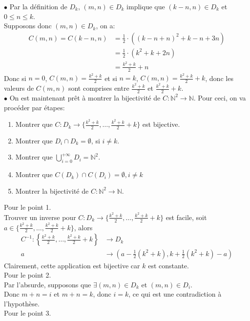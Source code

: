 \documentclass[11pt, a4paper]{article}
\begin{document}
		$\bullet$ Par la définition de $D_k$, $(m,n) \in D_k$ implique que $(k-n,n)\in D_k$ et $0\leq n\leq k$.\\
		Supposons donc $(m,n) \in D_k$, on a:
		\begin{align*}
			C(m,n)=C(k-n,n)&= \frac{1}{2} \cdot \left( (k-n+n)^{2} + k-n + 3n\right)\\
				       &= \frac{1}{2} \cdot \left( k^{2} + k + 2n\right)\\
				       &= \frac{k^{2}+k}{2} + n
		\end{align*}
		Donc si $n=0$, $C(m,n)= \frac{k^{2}+k}{2}$ et si $n=k$, $C(m,n)= \frac{k^{2}+k}{2}+k$, donc les valeurs de $C(m,n)$ sont comprises entre $\frac{k^{2}+k}{2}$ et  $\frac{k^{2}+k}{2}+k$.\\
		$\bullet$ On est maintenant prêt à montrer la bijectivité de $C: \mathbb{N}^{2} \to \mathbb{N}$.
		Pour ceci, on va procéder par étapes:
		\begin{enumerate}
			\item Montrer que $C:D_k \to \{\frac{k^{2}+k}{2},\ldots,\frac{k^{2}+k}{2}+k\}$ est bijective.
			\item Montrer que $ D_i \cap D_k= \emptyset$, si $i\neq k$.
			\item Montrer que $\bigcup_{i=0}^{+\infty} D_i = \mathbb{N}^{2}$.
			\item Montrer que $C(D_k)\cap C(D_i) = \emptyset, i \neq k$
			\item Montrer la bijectivité de $C: \mathbb{N}^{2} \to \mathbb{N}$.
		\end{enumerate}
		Pour le point 1.\\
		Trouver un inverse pour $C:D_k \to \{\frac{k^{2}+k}{2},\ldots,\frac{k^{2}+k}{2}+k\}$ est facile, soit $a \in \{\frac{k^{2}+k}{2},\ldots,\frac{k^{2}+k}{2}+k\}$, alors
		\begin{align*}
			C^{-1}: \left\{\frac{k^{2}+k}{2},\ldots,\frac{k^{2}+k}{2}+k\right\} &\to D_k\\
			a &\to \left(a-\frac{1}{2}(k^{2}+k),k+\frac{1}{2}(k^{2}+k)-a\right)
		\end{align*}
		Clairement, cette application est bijective car $k$ est constante.\\
		Pour le point 2.\\
		Par l'absurde, supposons que $\exists (m,n) \in D_k$ et $(m,n) \in D_i$.\\
		Donc $m+n=i$ et $m+n=k$, donc $i=k$, ce qui est une contradiction à l'hypothèse.\\
		Pour le point 3.\\
\end{document}
